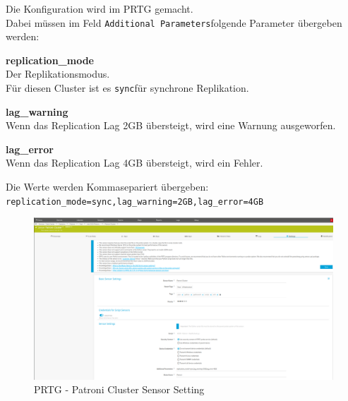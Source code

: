 \begin{flushleft}
    Die Konfiguration wird im \Gls{PRTG} gemacht.\\
    Dabei müssen im Feld \guillemotleft\texttt{Additional Parameters}\guillemotright folgende Parameter übergeben werden:
    \begin{description}
        \item \textbf{replication\_mode}\hfill \\Der Replikationsmodus.\\Für diesen Cluster ist es \guillemotleft\texttt{sync}\guillemotright für synchrone Replikation.
        \item \textbf{lag\_warning}\hfill \\Wenn das Replication Lag 2GB übersteigt, wird eine Warnung ausgeworfen.
        \item \textbf{lag\_error}\hfill \\Wenn das Replication Lag 4GB übersteigt, wird ein Fehler.
    \end{description}
\end{flushleft}
\clearpage
\begin{flushleft}
    Die Werte werden Kommasepariert übergeben:
    \texttt{replication\_mode=sync,lag\_warning=2GB,lag\_error=4GB}
    \begin{figure}[H]
        \centering
        \includegraphics[width=1\linewidth]{source/implementation/construction_implementation/monitoring/patroni_cluster_sensor_setting}
        \caption{\Gls{PRTG} - Patroni Cluster Sensor Setting}
        \label{fig:patroni_cluster_sensor_setting}
    \end{figure}
\end{flushleft}
